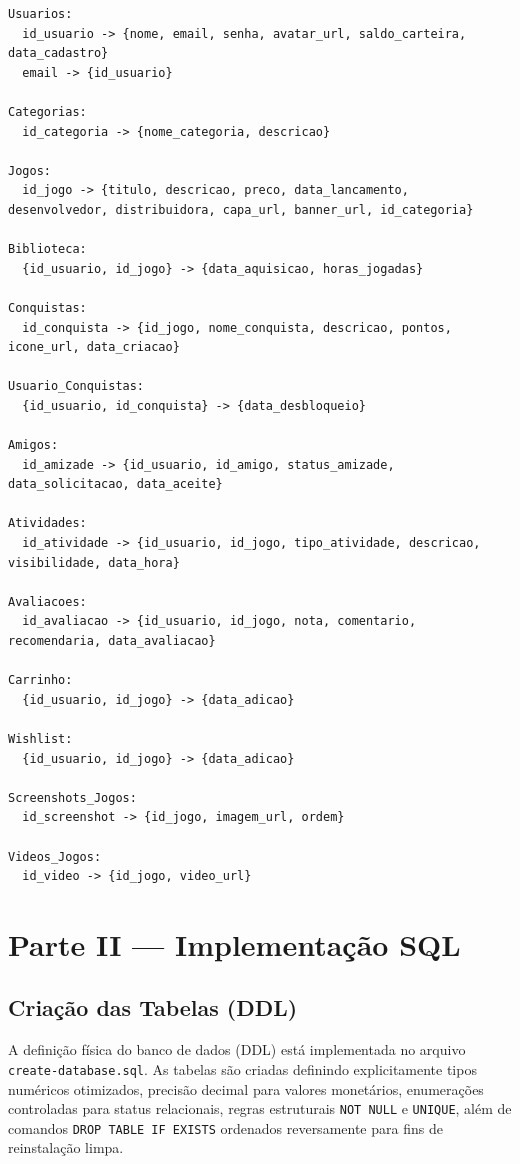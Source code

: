 \documentclass[12pt,a4paper]{article}
\begin{document}
\begin{lstlisting}
Usuarios:
  id_usuario -> {nome, email, senha, avatar_url, saldo_carteira, data_cadastro}
  email -> {id_usuario}

Categorias:
  id_categoria -> {nome_categoria, descricao}

Jogos:
  id_jogo -> {titulo, descricao, preco, data_lancamento, desenvolvedor, distribuidora, capa_url, banner_url, id_categoria}

Biblioteca:
  {id_usuario, id_jogo} -> {data_aquisicao, horas_jogadas}

Conquistas:
  id_conquista -> {id_jogo, nome_conquista, descricao, pontos, icone_url, data_criacao}

Usuario_Conquistas:
  {id_usuario, id_conquista} -> {data_desbloqueio}

Amigos:
  id_amizade -> {id_usuario, id_amigo, status_amizade, data_solicitacao, data_aceite}

Atividades:
  id_atividade -> {id_usuario, id_jogo, tipo_atividade, descricao, visibilidade, data_hora}

Avaliacoes:
  id_avaliacao -> {id_usuario, id_jogo, nota, comentario, recomendaria, data_avaliacao}

Carrinho:
  {id_usuario, id_jogo} -> {data_adicao}

Wishlist:
  {id_usuario, id_jogo} -> {data_adicao}

Screenshots_Jogos:
  id_screenshot -> {id_jogo, imagem_url, ordem}

Videos_Jogos:
  id_video -> {id_jogo, video_url}
\end{lstlisting}

\section{Parte II — Implementação SQL}

\subsection{Criação das Tabelas (DDL)}
A definição física do banco de dados (DDL) está implementada no arquivo \texttt{create-database.sql}. As tabelas são criadas definindo explicitamente tipos numéricos otimizados, precisão decimal para valores monetários, enumerações controladas para status relacionais, regras estruturais \texttt{NOT NULL} e \texttt{UNIQUE}, além de comandos \texttt{DROP TABLE IF EXISTS} ordenados reversamente para fins de reinstalação limpa.
\end{document}
